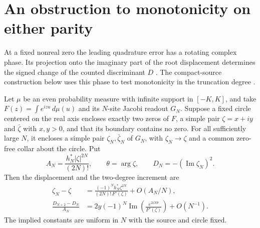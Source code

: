 \section{An obstruction to monotonicity on either parity}
\label{sec:parity}

At a fixed nonreal zero the leading quadrature error has a rotating
complex phase. Its projection onto the imaginary part of the root
displacement determines the signed change of the counted discriminant
\(D\) \cite[\S 2.2, Eq.~(2.4)]{agc}. The compact-source construction
below uses this phase to test monotonicity in the truncation
degree \cite{jh05}.

\begin{proposition}
\label{p:displacement}
Let \(\mu\) be an even probability measure with infinite support in
\([-K,K]\), and take \(F(z)=\int e^{izu}\,d\mu(u)\) and its
\(N\)-site Jacobi readout \(G_N\). Suppose a fixed circle centered on
the real axis encloses exactly two zeros of \(F\), a simple pair
\(\zeta=x+iy\) and \(\bar\zeta\) with \(x,y>0\), and that its boundary contains no zero.
For all sufficiently large \(N\), it encloses a simple pair
\(\zeta_N,\bar\zeta_N\) of \(G_N\), with \(\zeta_N\to\zeta\)
and a common zero-free collar about the circle. Put
\[
 A_N=\frac{h_N^*|\zeta|^{2N}}{(2N)!},\qquad
 \theta=\arg\zeta,\qquad D_N=-(\operatorname{Im}\zeta_N)^2 .
\]
Then the displacement and the two-degree increment are
\begin{align}
 \zeta_N-\zeta
   &=\frac{(-1)^N h_N^*\zeta^{2N}}{(2N)!\,F'(\zeta)}
     +O(A_N/N), \label{p:root-shift}\\
 \frac{D_{N+2}-D_N}{A_N}
   &=2y(-1)^N\operatorname{Im}
      \left(\frac{e^{2iN\theta}}{F'(\zeta)}\right)+O(N^{-1}).
      \label{p:degree-sign}
\end{align}
The implied constants are uniform in \(N\) with the source and
circle fixed.
\end{proposition}

